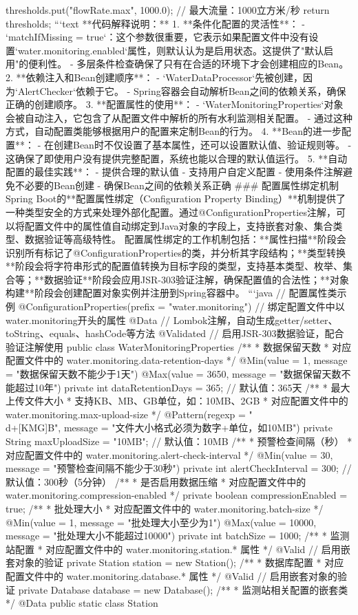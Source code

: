 {{thresholds.put("flowRate.max", 1000.0); // 最大流量：1000立方米/秒 return thresholds; } } ```text **代码解释说明：** 1. **条件化配置的灵活性**： - `matchIfMissing = true`：这个参数很重要，它表示如果配置文件中没有设置`water.monitoring.enabled`属性，则默认认为是启用状态。这提供了"默认启用"的便利性。 - 多层条件检查确保了只有在合适的环境下才会创建相应的Bean。 2. **依赖注入和Bean创建顺序**： - `WaterDataProcessor`先被创建，因为`AlertChecker`依赖于它。 - Spring容器会自动解析Bean之间的依赖关系，确保正确的创建顺序。 3. **配置属性的使用**： - `WaterMonitoringProperties`对象会被自动注入，它包含了从配置文件中解析的所有水利监测相关配置。 - 通过这种方式，自动配置类能够根据用户的配置来定制Bean的行为。 4. **Bean的进一步配置**： - 在创建Bean时不仅设置了基本属性，还可以设置默认值、验证规则等。 - 这确保了即使用户没有提供完整配置，系统也能以合理的默认值运行。 5. **自动配置的最佳实践**： - 提供合理的默认值 - 支持用户自定义配置 - 使用条件注解避免不必要的Bean创建 - 确保Bean之间的依赖关系正确 ### 配置属性绑定机制 Spring Boot的**配置属性绑定（Configuration Property Binding）**机制提供了一种类型安全的方式来处理外部化配置。通过@ConfigurationProperties注解，可以将配置文件中的属性值自动绑定到Java对象的字段上，支持嵌套对象、集合类型、数据验证等高级特性。 配置属性绑定的工作机制包括：**属性扫描**阶段会识别所有标记了@ConfigurationProperties的类，并分析其字段结构；**类型转换**阶段会将字符串形式的配置值转换为目标字段的类型，支持基本类型、枚举、集合等；**数据验证**阶段会应用JSR-303验证注解，确保配置值的合法性；**对象构建**阶段会创建配置对象实例并注册到Spring容器中。 ```java // 配置属性类示例 @ConfigurationProperties(prefix = "water.monitoring") // 绑定配置文件中以water.monitoring开头的属性 @Data // Lombok注解，自动生成getter/setter、toString、equals、hashCode等方法 @Validated // 启用JSR-303数据验证，配合验证注解使用 public class WaterMonitoringProperties { /** * 数据保留天数 * 对应配置文件中的 water.monitoring.data-retention-days */ @Min(value = 1, message = "数据保留天数不能少于1天") @Max(value = 3650, message = "数据保留天数不能超过10年") private int dataRetentionDays = 365; // 默认值：365天 /** * 最大上传文件大小 * 支持KB、MB、GB单位，如：10MB、2GB * 对应配置文件中的 water.monitoring.max-upload-size */ @Pattern(regexp = "\\d+[KMG]B", message = "文件大小格式必须为数字+单位，如10MB") private String maxUploadSize = "10MB"; // 默认值：10MB /** * 预警检查间隔（秒） * 对应配置文件中的 water.monitoring.alert-check-interval */ @Min(value = 30, message = "预警检查间隔不能少于30秒") private int alertCheckInterval = 300; // 默认值：300秒（5分钟） /** * 是否启用数据压缩 * 对应配置文件中的 water.monitoring.compression-enabled */ private boolean compressionEnabled = true; /** * 批处理大小 * 对应配置文件中的 water.monitoring.batch-size */ @Min(value = 1, message = "批处理大小至少为1") @Max(value = 10000, message = "批处理大小不能超过10000") private int batchSize = 1000; /** * 监测站配置 * 对应配置文件中的 water.monitoring.station.* 属性 */ @Valid // 启用嵌套对象的验证 private Station station = new Station(); /** * 数据库配置 * 对应配置文件中的 water.monitoring.database.* 属性 */ @Valid // 启用嵌套对象的验证 private Database database = new Database(); /** * 监测站相关配置的嵌套类 */ @Data public static class Station { }}
